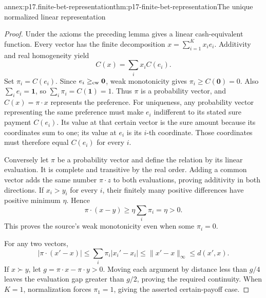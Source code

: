 \begin{annexitem}{annex:p17.finite-bet-representation}{thm:p17-finite-bet-representation}{The unique normalized linear representation}
\begin{proof}
Under the axioms the preceding lemma gives a linear cash-equivalent
function. Every vector has the finite decomposition
\(x=\sum_{i=1}^K x_i e_i\). Additivity and real homogeneity yield
\[
                          C(x)=\sum_i x_i C(e_i).
\]
Set \(\pi_i=C(e_i)\). Since \(e_i\geq_{\rm cw}\mathbf0\),
weak monotonicity gives \(\pi_i\geq C(\mathbf0)=0\).
Also \(\sum_i e_i=\mathbf1\), so
\(\sum_i\pi_i=C(\mathbf1)=1\). Thus \(\pi\) is a probability
vector, and \(C(x)=\pi\cdot x\) represents the preference.
For uniqueness, any probability vector representing the same preference
must make \(e_i\) indifferent to its stated sure payment \(C(e_i)\).
Its value at that certain vector is the sure amount because its
coordinates sum to one; its value at \(e_i\) is its \(i\)-th
coordinate. Those coordinates must therefore equal \(C(e_i)\)
for every \(i\).

Conversely let \(\pi\) be a probability vector and define the
relation by its linear evaluation. It is complete and transitive by
the real order. Adding a common vector adds the same number
\(\pi\cdot z\) to both evaluations, proving additivity in both
directions. If \(x_i>y_i\) for every \(i\), their finitely many
positive differences have positive minimum \(\eta\). Hence
\[
              \pi\cdot(x-y)\geq\eta\sum_i\pi_i=\eta>0.
\]
This proves the source's weak monotonicity even when some \(\pi_i=0\).

For any two vectors,
\[
            |\pi\cdot(x'-x)|
               \leq\sum_i\pi_i|x_i'-x_i|
               \leq\|x'-x\|_\infty\leq d(x',x).
\]
If \(x\succ y\), let \(g=\pi\cdot x-\pi\cdot y>0\).
Moving each argument by distance less than \(g/4\) leaves the
evaluation gap greater than \(g/2\), proving the required continuity.
When \(K=1\), normalization forces \(\pi_1=1\), giving the
asserted certain-payoff case.
\end{proof}
\end{annexitem}

